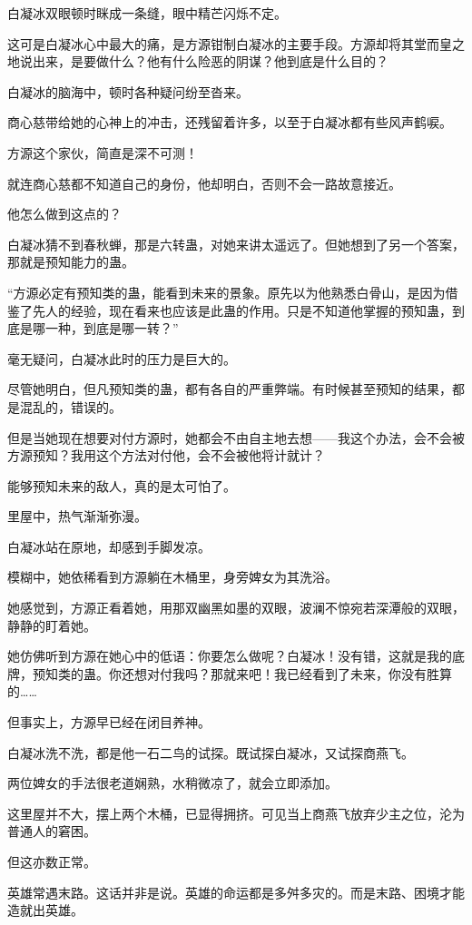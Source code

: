 \begin{this_body}
白凝冰双眼顿时眯成一条缝，眼中精芒闪烁不定。

这可是白凝冰心中最大的痛，是方源钳制白凝冰的主要手段。方源却将其堂而皇之地说出来，是要做什么？他有什么险恶的阴谋？他到底是什么目的？

白凝冰的脑海中，顿时各种疑问纷至沓来。

商心慈带给她的心神上的冲击，还残留着许多，以至于白凝冰都有些风声鹤唳。

方源这个家伙，简直是深不可测！

就连商心慈都不知道自己的身份，他却明白，否则不会一路故意接近。

他怎么做到这点的？

白凝冰猜不到春秋蝉，那是六转蛊，对她来讲太遥远了。但她想到了另一个答案，那就是预知能力的蛊。

“方源必定有预知类的蛊，能看到未来的景象。原先以为他熟悉白骨山，是因为借鉴了先人的经验，现在看来也应该是此蛊的作用。只是不知道他掌握的预知蛊，到底是哪一种，到底是哪一转？”

毫无疑问，白凝冰此时的压力是巨大的。

尽管她明白，但凡预知类的蛊，都有各自的严重弊端。有时候甚至预知的结果，都是混乱的，错误的。

但是当她现在想要对付方源时，她都会不由自主地去想——我这个办法，会不会被方源预知？我用这个方法对付他，会不会被他将计就计？

能够预知未来的敌人，真的是太可怕了。

里屋中，热气渐渐弥漫。

白凝冰站在原地，却感到手脚发凉。

模糊中，她依稀看到方源躺在木桶里，身旁婢女为其洗浴。

她感觉到，方源正看着她，用那双幽黑如墨的双眼，波澜不惊宛若深潭般的双眼，静静的盯着她。

她仿佛听到方源在她心中的低语：你要怎么做呢？白凝冰！没有错，这就是我的底牌，预知类的蛊。你还想对付我吗？那就来吧！我已经看到了未来，你没有胜算的……

但事实上，方源早已经在闭目养神。

白凝冰洗不洗，都是他一石二鸟的试探。既试探白凝冰，又试探商燕飞。

两位婢女的手法很老道娴熟，水稍微凉了，就会立即添加。

这里屋并不大，摆上两个木桶，已显得拥挤。可见当上商燕飞放弃少主之位，沦为普通人的窘困。

但这亦数正常。

英雄常遇末路。这话并非是说。英雄的命运都是多舛多灾的。而是末路、困境才能造就出英雄。


\end{this_body}
